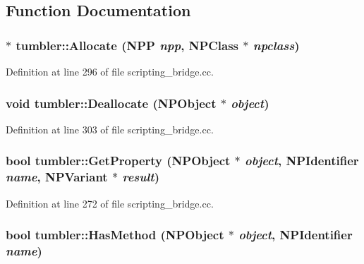 \subsection{Function Documentation}
\hypertarget{namespacetumbler_a133c46b3658a35f597bf5806a58c433e}{
\subsubsection[{Allocate}]{$\ast$ tumbler::Allocate ({\bf NPP} {\em npp}, \/  {\bf NPClass} $\ast$ {\em npclass})}}
\label{namespacetumbler_a133c46b3658a35f597bf5806a58c433e}


Definition at line 296 of file scripting\_\-bridge.cc.

\hypertarget{namespacetumbler_a6e665bba23bf978176f39f24fd07d501}{
\subsubsection[{Deallocate}]{\setlength{\rightskip}{0pt plus 5cm}void tumbler::Deallocate ({\bf NPObject} $\ast$ {\em object})}}
\label{namespacetumbler_a6e665bba23bf978176f39f24fd07d501}


Definition at line 303 of file scripting\_\-bridge.cc.

\hypertarget{namespacetumbler_a41d6ba518f6ce31f8fafc12eb9dd044c}{
\subsubsection[{GetProperty}]{\setlength{\rightskip}{0pt plus 5cm}bool tumbler::GetProperty ({\bf NPObject} $\ast$ {\em object}, \/  {\bf NPIdentifier} {\em name}, \/  {\bf NPVariant} $\ast$ {\em result})}}
\label{namespacetumbler_a41d6ba518f6ce31f8fafc12eb9dd044c}


Definition at line 272 of file scripting\_\-bridge.cc.

\hypertarget{namespacetumbler_a0440bebe4c3872dbed8390142035d1d1}{
\subsubsection[{HasMethod}]{\setlength{\rightskip}{0pt plus 5cm}bool tumbler::HasMethod ({\bf NPObject} $\ast$ {\em object}, \/  {\bf NPIdentifier} {\em name})}}
\label{namespacetumbler_a0440bebe4c3872dbed8390142035d1d1}


